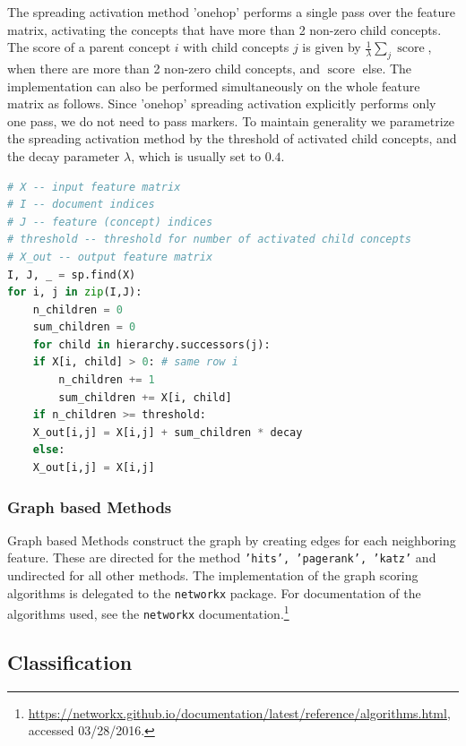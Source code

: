 \documentclass{article}
\begin{document}
The spreading activation method 'onehop' performs a single pass over the feature matrix,
activating the concepts that have more than 2 non-zero child concepts.
The score of a parent concept $i$ with child concepts $j$ is given by $\frac{1}{\lambda} \sum_j \operatorname{score}$,
when there are more than 2 non-zero child concepts, and $\operatorname{score}$ else.
The implementation can also be performed simultaneously on the whole feature matrix as follows.
Since 'onehop' spreading activation explicitly performs only one pass,
we do not need to pass markers.
To maintain generality we parametrize the spreading activation method by the threshold of activated child concepts,
and the decay parameter $\lambda$, which is usually set to $0.4$.
\begin{lstlisting}[language=python]
# X -- input feature matrix
# I -- document indices
# J -- feature (concept) indices
# threshold -- threshold for number of activated child concepts
# X_out -- output feature matrix
I, J, _ = sp.find(X)
for i, j in zip(I,J):
    n_children = 0
    sum_children = 0
    for child in hierarchy.successors(j):
	if X[i, child] > 0: # same row i
	    n_children += 1
	    sum_children += X[i, child]
    if n_children >= threshold:
	X_out[i,j] = X[i,j] + sum_children * decay
    else:
	X_out[i,j] = X[i,j]
\end{lstlisting}

\subsubsection{Graph based Methods}
\label{subsubsec:graphbased}
Graph based Methods construct the graph by creating edges for each neighboring feature.
These are directed for the method \texttt{'hits', 'pagerank', 'katz'}
and undirected for all other methods.
The implementation of the graph scoring algorithms is delegated to the \texttt{networkx} package.
For documentation of the algorithms used, see the \texttt{networkx} documentation.\footnote{
\url{https://networkx.github.io/documentation/latest/reference/algorithms.html}, accessed 03/28/2016.}

\subsection{Classification}
\end{document}
